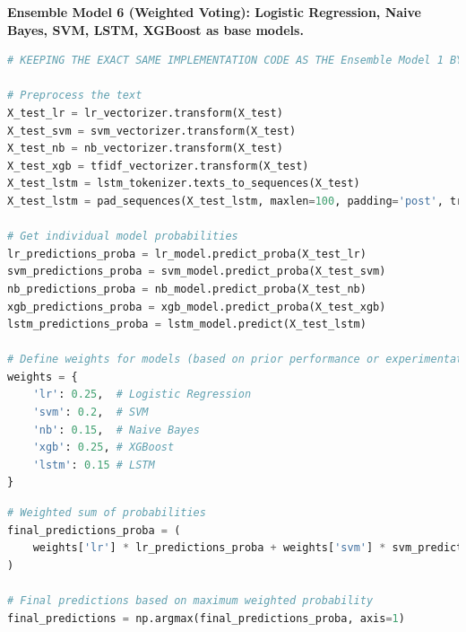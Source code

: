 \vspace{1em}

\noindent
\textbf{Ensemble Model 6 (Weighted Voting): Logistic Regression, Naive Bayes, SVM, LSTM, XGBoost as base models. }

\begin{tcolorbox}[colback=gray!5!white, colframe=gray!80!black, boxrule=0.5pt, title=Weighted Voting Ensemble for Classification]
    \begin{lstlisting}[language=Python]
# KEEPING THE EXACT SAME IMPLEMENTATION CODE AS THE Ensemble Model 1 BY IMPORTING THE NECESSARY LIBRARIES, LOADING THE MODELS, AND PREPROCESSING THE DATA

# Preprocess the text
X_test_lr = lr_vectorizer.transform(X_test)
X_test_svm = svm_vectorizer.transform(X_test)
X_test_nb = nb_vectorizer.transform(X_test)
X_test_xgb = tfidf_vectorizer.transform(X_test)
X_test_lstm = lstm_tokenizer.texts_to_sequences(X_test)
X_test_lstm = pad_sequences(X_test_lstm, maxlen=100, padding='post', truncating='post')

# Get individual model probabilities
lr_predictions_proba = lr_model.predict_proba(X_test_lr)
svm_predictions_proba = svm_model.predict_proba(X_test_svm)
nb_predictions_proba = nb_model.predict_proba(X_test_nb)
xgb_predictions_proba = xgb_model.predict_proba(X_test_xgb)
lstm_predictions_proba = lstm_model.predict(X_test_lstm)

# Define weights for models (based on prior performance or experimentation)
weights = {
    'lr': 0.25,  # Logistic Regression
    'svm': 0.2,  # SVM
    'nb': 0.15,  # Naive Bayes
    'xgb': 0.25, # XGBoost
    'lstm': 0.15 # LSTM
}
\end{lstlisting}
\end{tcolorbox}
\begin{tcolorbox}[colback=gray!5!white, colframe=gray!80!black, boxrule=0.5pt, title=Weighted Voting Ensemble for Classification]
    \begin{lstlisting}[language=Python]
# Weighted sum of probabilities
final_predictions_proba = (
    weights['lr'] * lr_predictions_proba + weights['svm'] * svm_predictions_proba + weights['nb'] * nb_predictions_proba + weights['xgb'] * xgb_predictions_proba + weights['lstm'] * lstm_predictions_proba
)

# Final predictions based on maximum weighted probability
final_predictions = np.argmax(final_predictions_proba, axis=1)
    \end{lstlisting}
\end{tcolorbox}

